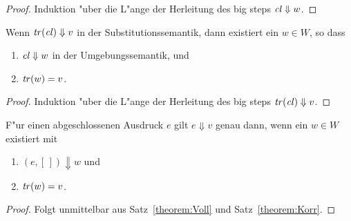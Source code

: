 \documentclass[12pt,fleqn,a4paper]{article}
\newcommand{\cl}{\name{cl}}
\begin{document}
\begin{proof}
  Induktion "uber die L"ange der Herleitung des big steps $\cl \Downarrow w$.
\end{proof}

\begin{theorem} \label{theorem:Voll}
  Wenn $\tr{\cl} \Downarrow v$ in der Substitutionssemantik, dann existiert ein $w \in W$, so dass
  \begin{enumerate}
  \item $\cl \Downarrow w$ in der Umgebungssemantik, und
  \item ${\text{\it tr\/}}(w) = v$.
  \end{enumerate}
\end{theorem}

\begin{proof}
  Induktion "uber die L"ange der Herleitung des big steps $\tr{\cl} \Downarrow v$.
\end{proof}

\begin{corollary}
  F"ur einen abgeschlossenen Ausdruck $e$ gilt $e \Downarrow v$ genau dann, wenn ein $w \in W$ existiert mit
  \begin{enumerate}
  \item $(e,[\,]) \Downarrow w$ und
  \item ${\text{\it tr\/}}(w) = v$.
  \end{enumerate}
\end{corollary}

\begin{proof}
  Folgt unmittelbar aus Satz~\ref{theorem:Voll} und Satz~\ref{theorem:Korr}.
\end{proof}
\end{document}
